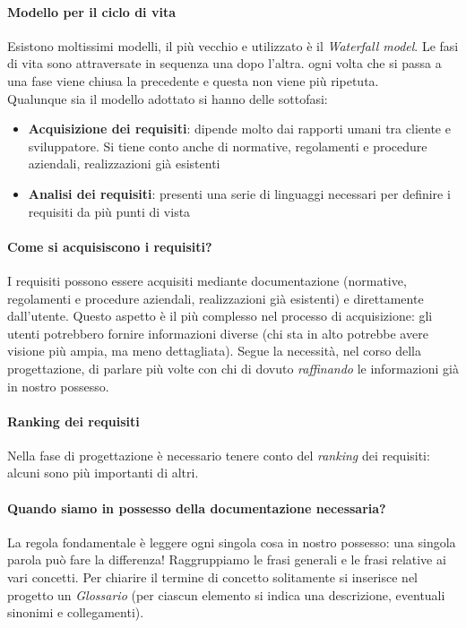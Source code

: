 \paragraph{Modello per il ciclo di vita} Esistono moltissimi modelli, il più vecchio e utilizzato è il \emph{Waterfall model}. Le fasi di vita sono attraversate in sequenza una dopo l'altra. ogni volta che si passa a una fase viene chiusa la precedente e questa non viene più ripetuta.\\
Qualunque sia il modello adottato si hanno delle sottofasi:
\begin{itemize}
	\item \textbf{Acquisizione dei requisiti}: dipende molto dai rapporti umani tra cliente e sviluppatore. Si tiene conto anche di normative, regolamenti e procedure aziendali, realizzazioni già esistenti
	\item \textbf{Analisi dei requisiti}: presenti una serie di linguaggi necessari per definire i requisiti da più punti di vista
\end{itemize}
\paragraph{Come si acquisiscono i requisiti?} I requisiti possono essere acquisiti mediante documentazione (normative, regolamenti e procedure aziendali, realizzazioni già esistenti) e direttamente dall'utente. Questo aspetto è il più complesso nel processo di acquisizione: gli utenti potrebbero fornire informazioni diverse (chi sta in alto potrebbe avere visione più ampia, ma meno dettagliata). Segue la necessità, nel corso della progettazione, di parlare più volte con chi di dovuto \emph{raffinando} le informazioni già in nostro possesso.
\paragraph{Ranking dei requisiti} Nella fase di progettazione è necessario tenere conto del \emph{ranking} dei requisiti: alcuni sono più importanti di altri.
\paragraph{Quando siamo in possesso della documentazione necessaria?} La regola fondamentale è leggere ogni singola cosa in nostro possesso: una singola parola può fare la differenza! Raggruppiamo le frasi generali e le frasi relative ai vari concetti. Per chiarire il termine di concetto solitamente si inserisce nel progetto un \emph{Glossario} (per ciascun elemento si indica una descrizione, eventuali sinonimi e collegamenti).

